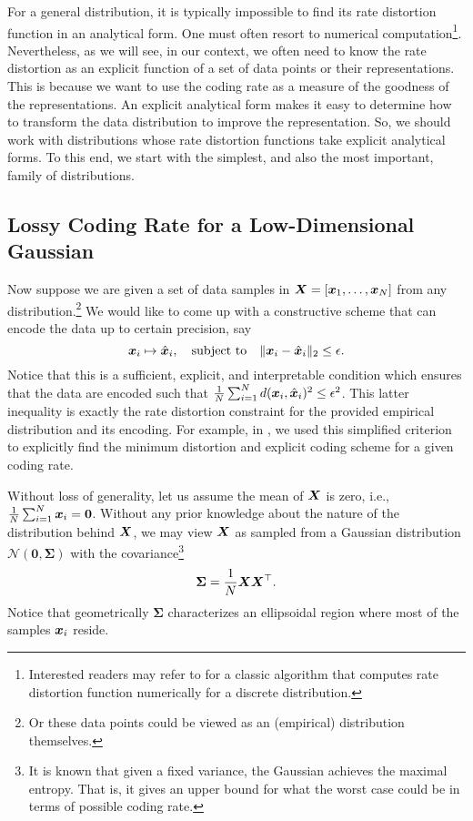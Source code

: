 \documentclass[../../book-main.tex]{subfiles}
\begin{document}
For a general distribution, it is typically impossible to find its rate
distortion function in an analytical form. One must often resort to numerical computation\footnote{Interested readers may refer to \cite{Blahut-1972} for a classic algorithm that computes rate distortion function numerically for a discrete distribution.}.  Nevertheless, as we will see, in our context, we often need to know the rate distortion as an explicit function of a set of data points or their representations. This is because we want to use the coding rate as a measure of the goodness of the representations. An explicit analytical form makes it easy to determine how to transform the data distribution to improve the representation. So, we should work with distributions whose rate distortion functions take explicit analytical forms. To this end, we start with the simplest, and also the most important, family of distributions.

\subsection{Lossy Coding Rate for a Low-Dimensional Gaussian}\label{subsec:lossy DR}
Now suppose we are given a set of data samples in $\bm{X} = [\bm{x}_1, \ldots, \bm{x}_N]$ from any distribution.\footnote{Or these data points could be viewed as an (empirical) distribution themselves.} We would like to come up with a constructive scheme that can encode the data up to certain precision, say
\begin{equation}
	\bm{x}_i \mapsto \hat {\bm{x}}_i, \quad \mbox{subject to} \quad \|\bm{x}_i - \hat {\bm{x}}_i\|_2 \le \epsilon.
\end{equation}
Notice that this is a sufficient, explicit, and interpretable condition which ensures that the data are encoded such that \(\frac{1}{N}\sum_{i = 1}^{N} d(\bm{x}_i, \hat {\bm{x}}_i)^{2} \le \epsilon^{2}\). This latter inequality is exactly the rate distortion constraint for the provided empirical distribution and its encoding. For example, in , we used this simplified criterion to explicitly find the minimum distortion and explicit coding scheme for a given coding rate.

Without loss of generality, let us assume the mean of $\bm{X}$ is zero, i.e., $\frac{1}{N} \sum_{i = 1}^{N} \bm{x}_i = \boldsymbol{0}$. Without any prior knowledge about the nature of the distribution behind $\bm{X}$, we may view $\bm{X}$ as sampled from a Gaussian distribution $\mathcal{N}(\boldsymbol{0}, {\boldsymbol{\Sigma}})$ with the covariance\footnote{It is known that given a fixed variance, the Gaussian achieves the maximal entropy. That is, it gives an upper bound for what the worst case could be in terms of possible coding rate.}
\begin{equation}
	{\boldsymbol{\Sigma}} = \frac{1}{N} \bm{X}\bm{X}^\top.
\end{equation}
Notice that geometrically ${\boldsymbol{\Sigma}}$ characterizes an ellipsoidal region where most of the samples $\bm{x}_i$ reside.
\end{document}
